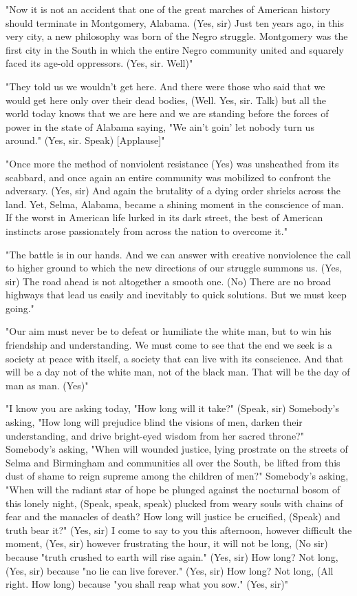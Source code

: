 "Now it is not an accident that one of the great marches of American
history should terminate in Montgomery, Alabama. (Yes, sir) Just ten
years ago, in this very city, a new philosophy was born of the Negro
struggle. Montgomery was the first city in the South in which the entire
Negro community united and squarely faced its age-old oppressors. (Yes,
sir. Well)"

"They told us we wouldn't get here. And there were those who said that
we would get here only over their dead bodies, (Well. Yes, sir. Talk)
but all the world today knows that we are here and we are standing
before the forces of power in the state of Alabama saying, "We ain't
goin' let nobody turn us around." (Yes, sir. Speak) {[}Applause{]}"

"Once more the method of nonviolent resistance (Yes) was unsheathed from
its scabbard, and once again an entire community was mobilized to
confront the adversary. (Yes, sir) And again the brutality of a dying
order shrieks across the land. Yet, Selma, Alabama, became a shining
moment in the conscience of man. If the worst in American life lurked in
its dark street, the best of American instincts arose passionately from
across the nation to overcome it."

"The battle is in our hands. And we can answer with creative nonviolence
the call to higher ground to which the new directions of our struggle
summons us. (Yes, sir) The road ahead is not altogether a smooth one.
(No) There are no broad highways that lead us easily and inevitably to
quick solutions. But we must keep going."

"Our aim must never be to defeat or humiliate the white man, but to win
his friendship and understanding. We must come to see that the end we
seek is a society at peace with itself, a society that can live with its
conscience. And that will be a day not of the white man, not of the
black man. That will be the day of man as man. (Yes)"

"I know you are asking today, "How long will it take?" (Speak, sir)
Somebody's asking, "How long will prejudice blind the visions of men,
darken their understanding, and drive bright-eyed wisdom from her sacred
throne?" Somebody's asking, "When will wounded justice, lying prostrate
on the streets of Selma and Birmingham and communities all over the
South, be lifted from this dust of shame to reign supreme among the
children of men?" Somebody's asking, "When will the radiant star of hope
be plunged against the nocturnal bosom of this lonely night, (Speak,
speak, speak) plucked from weary souls with chains of fear and the
manacles of death? How long will justice be crucified, (Speak) and truth
bear it?" (Yes, sir) I come to say to you this afternoon, however
difficult the moment, (Yes, sir) however frustrating the hour, it will
not be long, (No sir) because "truth crushed to earth will rise again."
(Yes, sir) How long? Not long, (Yes, sir) because "no lie can live
forever." (Yes, sir) How long? Not long, (All right. How long) because
"you shall reap what you sow." (Yes, sir)"

